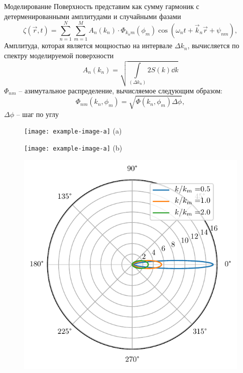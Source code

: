 \begin{frame}[t]{}
\begin{columns}[t]
\begin{column}{.48\linewidth}
\begin{block}{Моделирование}
            Поверхность представим как сумму гармоник с детерменированными амплитудами и случайными фазами
        \begin{equation}
            \zeta(\vec r, t)= \sum\limits_{n=1}^N \sum_{m=1}^M A_n(k_n)\cdot 
            \Phi_{k_nm}(\phi_m) \cos(\omega_n t + \vec k_n \vec r + \psi_{nm}),
        \end{equation}
        Амплитуда, которая является мощностью на интервале $\Delta k_n$, вычисляется по спектру моделируемой поверхности
        \begin{equation}
            A_n(k_n)=\sqrt{ \int\limits_{(\Delta k_n)}  2 S(k) \dd{k}}
        \end{equation}
        $\Phi_{nm}$ -- азимутальное распределение, вычисляемое следующим образом:
        \begin{equation}
        \Phi_{nm}(k_n,\phi_m)=\sqrt{\Phi(k_n,\phi_m) \Delta \phi},
        \end{equation}
        $\Delta \phi$ -- шаг по углу
        \begin{figure}[h]
            \begin{minipage}{0.24\linewidth}
                \texttt{[image: example-image-a]}
                \centering
                (a)
            \end{minipage}
            \begin{minipage}{0.24\linewidth}
                \texttt{[image: example-image-a]}
                \centering
                (b)
            \end{minipage}
            \begin{minipage}{0.24\linewidth}
                \includegraphics[width=\linewidth]{fig/full_angles1}

\end{minipage}
\end{figure}
\end{block}
\end{column}
\end{columns}
\end{frame}

